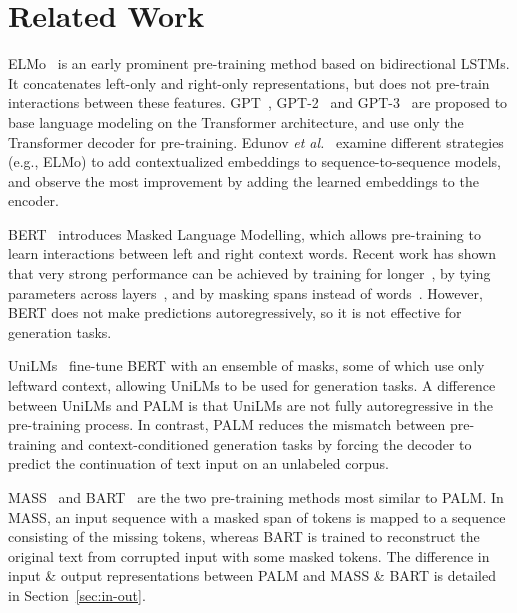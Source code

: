 \documentclass[11pt,a4paper]{article}
\newcommand{\method}{PALM\xspace}
\begin{document}
\vspace{-5pt}
\section{Related Work}
\vspace{-5pt}
ELMo~\cite{peters-etal-2018-deep} is an early prominent pre-training method based on bidirectional LSTMs. It concatenates left-only and right-only representations, but does not pre-train interactions between these features. GPT~\cite{Radford2018ImprovingLU}, GPT-2~\cite{gpt2} and GPT-3~\cite{gpt3} are proposed to base language modeling on the Transformer architecture, and use only the Transformer decoder for pre-training. Edunov \emph{et al.}~\cite{Edunov:2019} examine different strategies (e.g., ELMo) to add contextualized embeddings to sequence-to-sequence models, and observe the most improvement by adding the learned embeddings to the encoder.

BERT~\cite{bert2018jacob} introduces Masked Language Modelling, which allows pre-training to learn interactions between left and right context words. Recent work has shown that very strong performance can be achieved by training for longer~\cite{roberta2019}, by tying parameters across layers~\cite{albert2019}, and by masking spans instead of words~\cite{spanbert2019}. However, BERT does not make predictions autoregressively, so it is not effective for generation tasks.

UniLMs~\cite{unilm2019,unilmv2} fine-tune BERT with an ensemble of masks, some of which use only leftward context, allowing UniLMs to be used for generation tasks. A difference between UniLMs and \method is that UniLMs are not fully autoregressive in the pre-training process. In contrast, \method reduces the mismatch between pre-training and context-conditioned generation tasks by forcing the decoder to predict the continuation of text input on an unlabeled corpus.

MASS~\cite{mass2019song} and BART~\cite{bart2019} are the two pre-training methods most similar to \method. In MASS, an input sequence with a masked span of tokens is mapped to a sequence consisting of the missing tokens, whereas BART is trained to reconstruct the original text from corrupted input with some masked tokens. The difference in input \& output representations between \method and MASS \& BART is detailed in Section~\ref{sec:in-out}.
\end{document}
